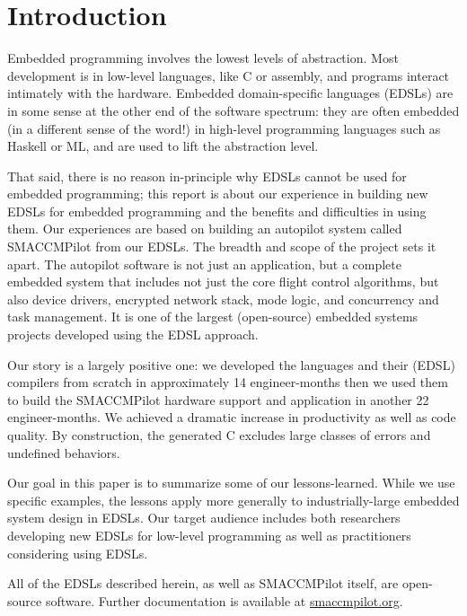 \section{Introduction}

Embedded programming involves the lowest levels of abstraction.  Most development
is in low-level languages, like C or assembly, and programs interact intimately
with the hardware.  Embedded domain-specific languages (EDSLs) are in
some sense at the other end of the software spectrum: they are often embedded
(in a different sense of the word!) in high-level programming languages such as
Haskell or ML, and are used to lift the abstraction level.

That said, there is no reason in-principle why EDSLs cannot be used for embedded
programming; this report is about our experience in building new EDSLs for
embedded programming and the benefits and difficulties in using them.  Our
experiences are based on building an autopilot system called SMACCMPilot from
our EDSLs.  The breadth and scope of the project sets it apart.  The autopilot
software is not just an application, but a complete embedded system that
includes not just the core flight control algorithms, but also device drivers,
encrypted network stack, mode logic, and concurrency and task management.  It is
one of the largest (open-source) embedded systems projects developed using the
EDSL approach.

Our story is a largely positive one: we developed the languages and their (EDSL)
compilers from scratch in approximately 14 engineer-months then we used them to
build the SMACCMPilot hardware support and application in another 22
engineer-months.  We achieved a dramatic increase in productivity as well as
code quality.  By construction, the generated C excludes large classes of errors
and undefined behaviors.

Our goal in this paper is to summarize some of our lessons-learned.  While we
use specific examples, the lessons apply more generally to industrially-large
embedded system design in EDSLs.  Our target audience includes both researchers
developing new EDSLs for low-level programming as well as practitioners
considering using EDSLs.

All of the EDSLs described herein, as well as SMACCMPilot itself, are
open-source software. Further documentation is available at \url{smaccmpilot.org}.




